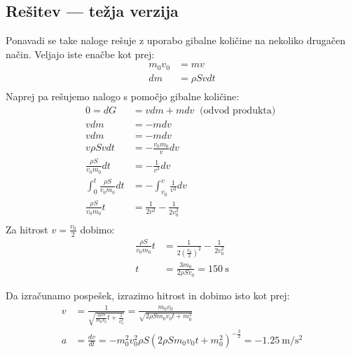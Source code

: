 \documentclass[a4,11pt]{article}
\begin{document}
\subsection*{Rešitev --- težja verzija}
    Ponavadi se take naloge rešuje z uporabo gibalne količine na nekoliko drugačen način.
    Veljajo iste enačbe kot prej:
    \begin{align*}
        m_0 v_0 &= m v \\
        dm &= \rho S v dt \\
    \end{align*}
    Naprej pa rešujemo nalogo s pomočjo gibalne količine:
    \begin{align*}
        0 = dG &= v dm + m dv \ \text{ (odvod produkta) } \\
        v dm &= - m dv \\
        v dm &= -m dv \\
        v \rho S v dt &= -\frac{v_0 m_0}{v} dv \\
        \frac{\rho S}{v_0 m_0} dt &= - \frac{1}{v^3} dv \\
        \int_{0}^{t} \frac{\rho S}{v_0 m_0} dt &= - \int_{v_0}^{v} \frac{1}{v^3} dv \\
        \frac{\rho S}{v_0 m_0} t &= \frac{1}{2v^2} - \frac{1}{2v_0^2} \\
    \end{align*}
    Za hitrost \(v = \frac{v_0}{2}\) dobimo:
    \begin{align*}
        \frac{\rho S}{v_0 m_0} t &= \frac{1}{2{\left(\frac{v_0}{2}\right)}^2} - \frac{1}{2v_0^2} \\
        t &= \frac{3m_0}{2\rho S v_0} = \qty{150}{\s}
    \end{align*}

    Da izračunamo pospešek, izrazimo hitrost in dobimo isto kot prej:
    \begin{align*}
        v &= \frac{1}{\sqrt{\frac{2\rho S}{m_0 v_0}t + \frac{1}{v_0^2}}} = \frac{m_0 v_0}{\sqrt{2\rho S m_0 v_0 t + m_0^2}} \\
        a &= \frac{dv}{dt} = - m_0^2 v_0^2 \rho S {\left(2\rho S m_0 v_0 t + m_0^2\right)}^{-\frac{3}{2}} = \qty{-1.25}{\metre\per\second\squared} \\
    \end{align*}
\end{document}
